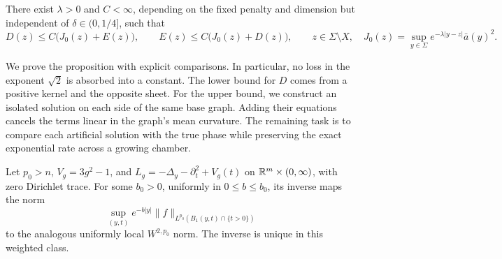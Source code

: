 \begin{proposition}
\label{prop:interface-exact-comparison}
There exist $\lambda>0$ and $C<\infty$, depending on the fixed
penalty and dimension but independent of $\delta\in(0,1/4]$, such that
\begin{equation}\label{eq:L5}
 D(z)\le C\bigl(J_0(z)+E(z)\bigr),\qquad
 E(z)\le C\bigl(J_0(z)+D(z)\bigr),\qquad z\in\Sigma\setminus X,
 \quad J_0(z)=\sup_{y\in\Sigma}e^{-\lambda|y-z|}\bar a(y)^2.
\end{equation}
\end{proposition}

We prove the proposition with explicit comparisons.  In particular,
no loss in the exponent $\sqrt2$ is absorbed into a constant.
The lower bound for $D$ comes from a positive kernel and the opposite
sheet.  For the upper bound, we construct an isolated solution on each
side of the same base graph.  Adding their equations cancels the terms
linear in the graph's mean curvature.  The remaining task is to compare
each artificial solution with the true phase while preserving the exact
exponential rate across a growing chamber.

\begin{lemma}\label{lem:interface-halfspace-inverse}
Let $p_0>n$, $V_g=3g^2-1$, and
$L_g=-\Delta_y-\partial_t^2+V_g(t)$ on $\mathbb R^m\times(0,\infty)$,
with zero Dirichlet trace.  For some $b_0>0$, uniformly in
$0\le b\le b_0$, its inverse maps the norm
\[
 \sup_{(y,t)}e^{-b|y|}\|f\|_{L^{p_0}(B_1(y,t)\cap\{t>0\})}
\]
to the analogous uniformly local $W^{2,p_0}$ norm.  The inverse
is unique in this weighted class.
\end{lemma}

